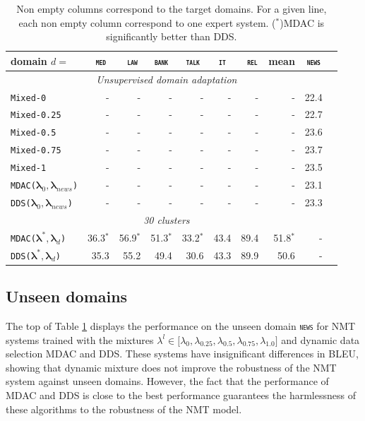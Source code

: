 \documentclass[11pt]{article}
\newcommand{\domain}[1]{\texttt{\textsc{#1}}}
\newcommand{\system}[1]{\texttt{{#1}}}
\newcommand{\vlambda}{\ensuremath{\boldsymbol\lambda}\xspace} %
\begin{document}
\begin{table}[htbp]
  \centering \small
  \begin{tabular}{|l|*9{r|}} \hline
    domain \hfill $d=$ & \multicolumn{1}{c|}{\domain{ med}} & \multicolumn{1}{c|}{\domain{ law}} & \multicolumn{1}{c|}{\domain{bank}} & \multicolumn{1}{c|}{\domain{talk}} & \multicolumn{1}{c|}{\domain{ it }} & \multicolumn{1}{c|}{\domain{ rel}} & \multicolumn{1}{c|}{mean} & \multicolumn{1}{|c|}{\domain{news}} \\ \hline \hline
    \multicolumn{9}{|c|}{\sl Unsupervised domain adaptation} \\ \hline
    \system{Mixed-0}      & - & - & - & - & - & - & - & 22.4 \\
    \system{Mixed-0.25} & - & - & - & - & - & - & - & 22.7\\
    \system{Mixed-0.5}   & - & - & - & - & - & - & - & 23.6\\
    \system{Mixed-0.75} & - & - & - & - & - & - & - & 23.7\\
    \system{Mixed-1} & - & - & - & - & - & - & - & 23.5\\
    \hline \hline
    \system{MDAC($\vlambda_0, \vlambda_{news}$)} &-&-&-&-&-&-&-&23.1 \\
     \system{DDS($\vlambda_0, \vlambda_{news}$)} &-&-&-&-&-&-&-&23.3 \\ \hline\hline 
    \multicolumn{9}{|c|}{\sl 30 clusters} \\ \hline
    \system{MDAC($\vlambda^*, \vlambda_d$)}&36.3$^*$&56.9$^*$&51.3$^*$&33.2$^*$&43.4&89.4&51.8$^*$&-\\
     \system{DDS($\vlambda^*, \vlambda_d$)}&35.3&55.2&49.4&30.6&43.3&89.9&50.6&-\\ \hline
  \end{tabular}
  \caption{Non empty columns correspond to the target domains. For a given line, each non empty column correspond to one expert system. ($^*$)MDAC is significantly better than DDS.}
  \label{tab:unsupervised-da}
\end{table}

\subsection{Unseen domains}\label{ssec:uda}
The top of Table \ref{tab:unsupervised-da} displays the performance on the unseen domain \domain{news} for NMT systems trained with the mixtures $\lambda^l \in \big[ \lambda_0, \lambda_{0.25}, \lambda_{0.5}, \lambda_{0.75}, \lambda_{1.0}\big]$ and dynamic data selection MDAC and DDS. These systems have insignificant differences in BLEU, showing that dynamic mixture does not improve the robustness of the NMT system against unseen domains. However, the fact that the performance of MDAC and DDS is close to the best performance guarantees the harmlessness of these algorithms to the robustness of the NMT model.
\end{document}

